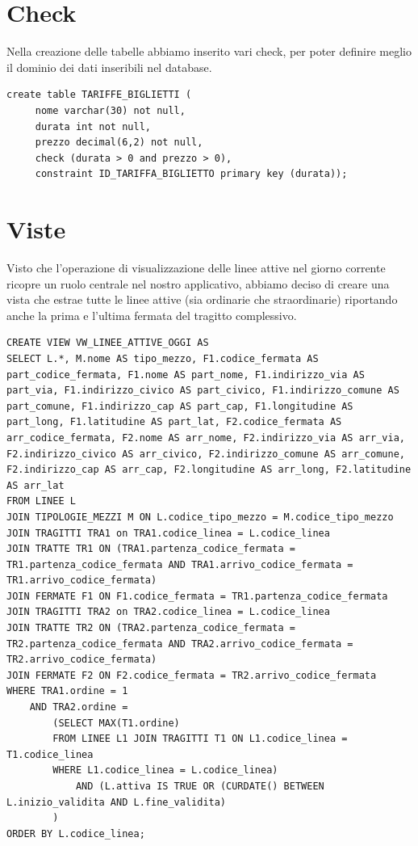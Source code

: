 \documentclass[12pt,a4paper]{report}
\begin{document}
\section{Check}	
Nella creazione delle tabelle abbiamo inserito vari check, per poter definire meglio il dominio dei dati inseribili nel database. \\

\begin{lstlisting}[style=sqlstyle, caption=Esempio di check utilizzato per definire gli attributi \texttt{prezzo} e \texttt{durata} come numeri positivi.]
create table TARIFFE_BIGLIETTI (
     nome varchar(30) not null,
     durata int not null,
     prezzo decimal(6,2) not null,
     check (durata > 0 and prezzo > 0),
     constraint ID_TARIFFA_BIGLIETTO primary key (durata));
\end{lstlisting}

\section{Viste}
Visto che l'operazione di visualizzazione delle linee attive nel giorno corrente ricopre un ruolo centrale nel nostro applicativo, abbiamo deciso di creare una vista che estrae tutte le linee attive (sia ordinarie che straordinarie) riportando anche la prima e l'ultima fermata del tragitto complessivo. \\
\begin{lstlisting}[style=sqlstyle, label=code:lines_view, caption=Codice SQL per la creazione della vista]
CREATE VIEW VW_LINEE_ATTIVE_OGGI AS
SELECT L.*, M.nome AS tipo_mezzo, F1.codice_fermata AS part_codice_fermata, F1.nome AS part_nome, F1.indirizzo_via AS part_via, F1.indirizzo_civico AS part_civico, F1.indirizzo_comune AS part_comune, F1.indirizzo_cap AS part_cap, F1.longitudine AS part_long, F1.latitudine AS part_lat, F2.codice_fermata AS arr_codice_fermata, F2.nome AS arr_nome, F2.indirizzo_via AS arr_via, F2.indirizzo_civico AS arr_civico, F2.indirizzo_comune AS arr_comune, F2.indirizzo_cap AS arr_cap, F2.longitudine AS arr_long, F2.latitudine AS arr_lat
FROM LINEE L
JOIN TIPOLOGIE_MEZZI M ON L.codice_tipo_mezzo = M.codice_tipo_mezzo
JOIN TRAGITTI TRA1 on TRA1.codice_linea = L.codice_linea
JOIN TRATTE TR1 ON (TRA1.partenza_codice_fermata = TR1.partenza_codice_fermata AND TRA1.arrivo_codice_fermata = TR1.arrivo_codice_fermata)
JOIN FERMATE F1 ON F1.codice_fermata = TR1.partenza_codice_fermata
JOIN TRAGITTI TRA2 on TRA2.codice_linea = L.codice_linea
JOIN TRATTE TR2 ON (TRA2.partenza_codice_fermata = TR2.partenza_codice_fermata AND TRA2.arrivo_codice_fermata = TR2.arrivo_codice_fermata)
JOIN FERMATE F2 ON F2.codice_fermata = TR2.arrivo_codice_fermata
WHERE TRA1.ordine = 1
    AND TRA2.ordine =
        (SELECT MAX(T1.ordine)
        FROM LINEE L1 JOIN TRAGITTI T1 ON L1.codice_linea = T1.codice_linea
        WHERE L1.codice_linea = L.codice_linea)
            AND (L.attiva IS TRUE OR (CURDATE() BETWEEN L.inizio_validita AND L.fine_validita)
        )
ORDER BY L.codice_linea;
\end{lstlisting}
\end{document}

